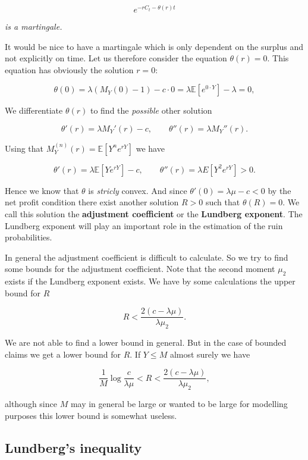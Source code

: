 \documentclass[a4paper,12pt,openany]{book}
\begin{document}
\[
e^{-rC_t-\theta(r)t}
\]

\emph{is a martingale.}

It would be nice to have a martingale which is only dependent on the surplus and not explicitly on time. Let us therefore consider the equation \(\theta(r) = 0\). This equation has obviously the solution \(r = 0\):

\[
\theta(0)=\lambda(M_Y(0)-1)-c\cdot 0=\lambda\mathbb E[e^{0\cdot Y}]-\lambda=0,
\]

We differentiate \(\theta(r)\) to find the \emph{possible} other solution

\[
\theta'(r)=\lambda M_Y'(r)-c,\qquad \theta''(r)=\lambda M_Y''(r).
\]

Using that \(M_Y^{(n)}(r)=\mathbb E[Y^ne^{rY}]\) we have

\[
\theta'(r)=\lambda \mathbb E[Ye^{rY}] - c,\qquad \theta''(r)=\lambda E[Y^2e^{rY}]>0.
\]

Hence we know that \(\theta\) is \emph{stricly} convex. And since \(\theta'(0)=\lambda\mu-c<0\) by the net profit condition there exist another solution \(R>0\) such that \(\theta(R)=0\). We call this solution the \textbf{adjustment coefficient} or the \textbf{Lundberg exponent}. The Lundberg exponent will play an important role in the estimation of the ruin probabilities.

In general the adjustment coefficient is difficult to calculate. So we try to find some bounds for the adjustment coefficient. Note that the second moment \(μ_2\) exists if the Lundberg exponent exists. We have by some calculations the upper bound for \(R\)

\[
R<\frac{2(c-\lambda\mu)}{\lambda \mu_2}.
\]

We are not able to find a lower bound in general. But in the case of bounded claims we get a lower bound for \(R\). If \(Y\le M\) almost surely we have

\[
\frac{1}{M}\log\frac{c}{\lambda \mu}<R<\frac{2(c-\lambda\mu)}{\lambda \mu_2},
\]

although since \(M\) may in general be large or wanted to be large for modelling purposes this lower bound is somewhat useless.

\hypertarget{lundbergs-inequality}{%
\subsection{Lundberg's inequality}\label{lundbergs-inequality}}
\end{document}
